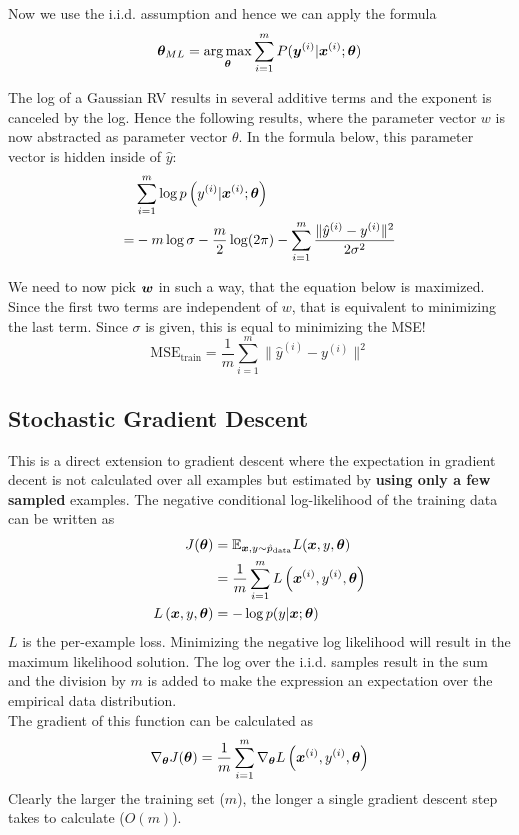 \begin{multicols}{2}
	Now we use the i.i.d. assumption and hence we can apply the formula
	\[ \bol{\theta}_{ML} = \underset{\bol{\theta}}{\arg \max} \sum_{i=1}^{m} P(\bol{y}^{(i)}|\bol{x}^{(i)};\bol{\theta}) \]

	The log of a Gaussian RV results in several additive terms and the exponent is canceled by the log.
	Hence the following results, where the parameter vector $w$ is now abstracted as parameter vector $\theta$.
	In the formula below, this parameter vector is hidden inside of $\hat{y}$:
	\begin{align*}
	&\sum_{i=1}^{m} \log p\left(y^{(i)}|\bol{x}^{(i)};\bol{\theta}\right)\\
	= &-m\log\sigma - \frac{m}{2}\log(2\pi)-\sum_{i=1}^{m}\frac{\lVert\hat{y}^{(i)}-y^{(i)}\rVert^2}{2\sigma^2}
	\end{align*}

	We need to now pick $\bol{w}$ in such a way, that the equation below is maximized.
	Since the first two terms are independent of $w$, that is equivalent to minimizing the last term.
	Since $\sigma$ is given, this is equal to minimizing the MSE!
	\[ \text{MSE}_{\text{train}}=\frac{1}{m}\sum_{i=1}^{m}\lVert \hat{y}^{(i)}-y^{(i)}\rVert^2 \]

	\subsection{Stochastic Gradient Descent}
	This is a direct extension to gradient descent where the expectation in gradient decent is not calculated over all examples but estimated by \textbf{using only a few sampled} examples.
	The negative conditional log-likelihood of the training data can be written as
	\begin{align*}
	J(\bol{\theta}) &= \Exp_{\bol{x},y\sim \hat{p}_{\text{data}}} L(\vx,y,\bol{\theta})\\
	&= \frac{1}{m} \sum_{i=1}^m L\left(\vx^{(i)},y^{(i)},\bol{\theta}\right)\\
	L\left(\vx,y,\bol{\theta}\right) &= -\log p(y|\vx;\bol{\theta})
	\end{align*}
	$L$ is the per-example loss. Minimizing the negative log likelihood will result in the maximum likelihood solution.
	The log over the i.i.d. samples result in the sum and the division by $m$ is added to make the expression an expectation over the empirical data distribution.\\
	The gradient of this function can be calculated as
	\[ \nabla_{\bol{\theta}}J(\bol{\theta}) = \frac{1}{m}\sum_{i=1}^{m}\nabla_\bolt L\left(\vx^{(i)},y^{(i)},\bolt\right) \]
	Clearly the larger the training set ($m$), the longer a single gradient descent step takes to calculate ($O(m)$).\\


\end{multicols}
